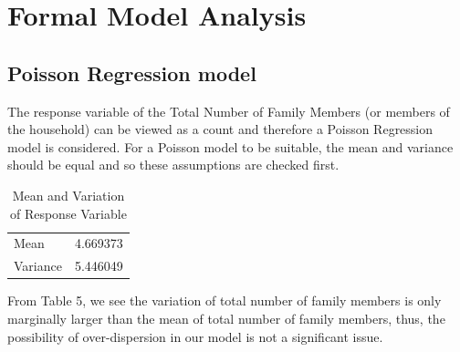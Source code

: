 \documentclass[
]{article}
\begin{document}
\newpage

\hypertarget{sec:FMA}{%
\section{Formal Model Analysis}\label{sec:FMA}}

\hypertarget{poisson-regression-model}{%
\subsection{Poisson Regression model}\label{poisson-regression-model}}

The response variable of the Total Number of Family Members (or members
of the household) can be viewed as a count and therefore a Poisson
Regression model is considered. For a Poisson model to be suitable, the
mean and variance should be equal and so these assumptions are checked
first.

\begin{table}

\caption{\label{tab:poisson mean and variance check}Mean and Variation of Response Variable}
\centering
\begin{tabular}[t]{l|r}
\hline
  & \\
\hline
Mean & 4.669373\\
\hline
Variance & 5.446049\\
\hline
\end{tabular}
\end{table}

From Table 5, we see the variation of total number of family members is
only marginally larger than the mean of total number of family members,
thus, the possibility of over-dispersion in our model is not a
significant issue.
\end{document}
